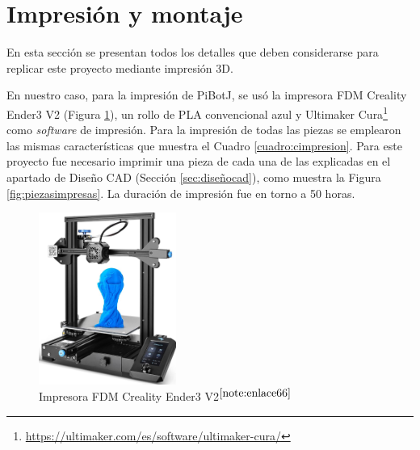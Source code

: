\section{Impresión y montaje}
\label{sec:impresionmontaje}

En esta sección se presentan todos los detalles que deben considerarse para replicar este proyecto mediante impresión 3D. 

En nuestro caso, para la impresión de PiBotJ, se usó la impresora FDM Creality Ender3 V2 (Figura \ref{fig:impresora}), un rollo de PLA convencional azul y Ultimaker Cura\footnote{\url{https://ultimaker.com/es/software/ultimaker-cura/}} como \textit{software} de impresión. Para la impresión de todas las piezas se emplearon las mismas características que muestra el Cuadro \ref{cuadro:cimpresion}. Para este proyecto fue necesario imprimir una pieza de cada una de las explicadas en el apartado de Diseño CAD (Sección \ref{sec:diseñocad}), como muestra la Figura \ref{fig:piezasimpresas}. La duración de impresión fue en torno a 50 horas.
 
\begin{figure} [h!]
	\begin{center}
		\includegraphics[width=4.5cm]{figs/cap5/impresora.jpg}
	\end{center}
	\caption{Impresora FDM Creality Ender3 V2$^{\ref{note:enlace66}}$} 
	\label{fig:impresora}
\end{figure}

\setcounter{footnote}{66} %

